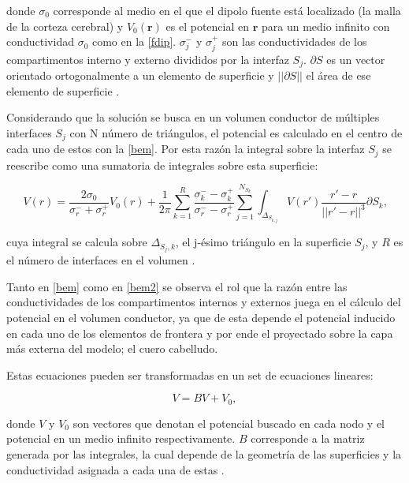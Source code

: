 donde $\sigma_{0}$ corresponde al medio en el que el dipolo fuente está localizado (la malla de la corteza cerebral) y $V_{0}(\mathbf{r})$ es el potencial en $\mathbf{r}$ para un medio infinito con conductividad $\sigma_{0}$ como en la \cref{fdip}. $\sigma_{j}^{-}$ y $\sigma_{j}^{+}$ son las conductividades de los compartimentos interno y externo divididos por la interfaz $S_{j}$. $\partial S$ es un vector orientado ortogonalmente a un elemento de superficie y $||\partial S||$ el área de ese elemento de superficie \cite{Hallez2007}. 

Considerando que la solución se busca en un volumen conductor de múltiples interfaces $S_{j}$ con N número de triángulos, el potencial es calculado en el centro de cada uno de estos con la \cref{bem}. Por esta razón la integral sobre la interfaz $S_{j}$ se reescribe como una sumatoria de integrales sobre esta superficie:

\begin{equation}
	\label{bem2}
	V(r) = \frac{2\sigma_{0}}{\sigma_{r}^{-} + {\sigma_{r}^{+}}} V_{0}(r) + \frac{1}{2\pi} \sum_{k=1}^{R}\frac{\sigma_{k}^{-}-\sigma_{k}^{+}}{\sigma_{r}^{-}-\sigma_{r}^{+}} \sum_{j=1}^{N_{S_{k}}} \int_{\Delta_{S_{k,j}}} V(r') \frac{r'-r}{||r'-r||^3}\partial S_{k}\text{,}
\end{equation}

cuya integral se calcula sobre $\Delta_{S_{j},k}$, el j-ésimo triángulo en la superficie $S_{j}$, y $R$ es el número de interfaces en el volumen \cite{Hallez2007}. 

Tanto en \cref{bem} como en \cref{bem2} se observa el rol que la razón entre las conductividades de los compartimentos internos y externos juega en el cálculo del potencial en el volumen conductor, ya que de esta depende el potencial inducido en cada uno de los elementos de frontera y por ende el proyectado sobre la capa más externa del modelo; el cuero cabelludo.

Estas ecuaciones pueden ser transformadas en un set de ecuaciones lineares:

\begin{equation}
	\label{lineal}
	V = BV + V_{0},
\end{equation}

donde $V$ y $V_{0}$ son vectores que denotan el potencial buscado en cada nodo y el potencial en un medio infinito respectivamente. $B$ corresponde a la matriz generada por las integrales, la cual depende de la geometría de las superficies y la conductividad asignada a cada una de estas \cite{Hallez2007}.

